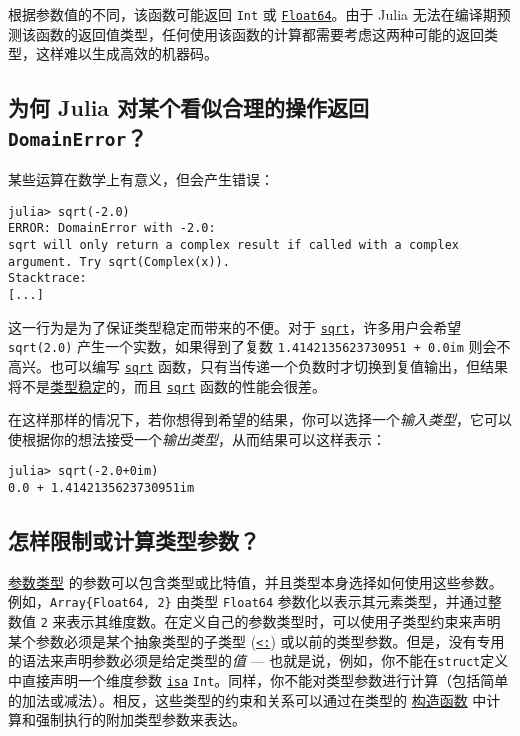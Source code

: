 根据参数值的不同，该函数可能返回 \texttt{Int} 或 \hyperlink{5027751419500983000}{\texttt{Float64}}。由于 Julia 无法在编译期预测该函数的返回值类型，任何使用该函数的计算都需要考虑这两种可能的返回类型，这样难以生成高效的机器码。



\hypertarget{6904365807459053438}{}


\subsection{为何 Julia 对某个看似合理的操作返回 \texttt{DomainError}？}



某些运算在数学上有意义，但会产生错误：




\begin{verbatim}
julia> sqrt(-2.0)
ERROR: DomainError with -2.0:
sqrt will only return a complex result if called with a complex argument. Try sqrt(Complex(x)).
Stacktrace:
[...]
\end{verbatim}



这一行为是为了保证类型稳定而带来的不便。对于 \hyperlink{4551113327515323898}{\texttt{sqrt}}，许多用户会希望 \texttt{sqrt(2.0)} 产生一个实数，如果得到了复数 \texttt{1.4142135623730951 + 0.0im} 则会不高兴。也可以编写 \hyperlink{4551113327515323898}{\texttt{sqrt}} 函数，只有当传递一个负数时才切换到复值输出，但结果将不是\hyperlink{5872221809740029239}{类型稳定}的，而且 \hyperlink{4551113327515323898}{\texttt{sqrt}} 函数的性能会很差。



在这样那样的情况下，若你想得到希望的结果，你可以选择一个\emph{输入类型}，它可以使根据你的想法接受一个\emph{输出类型}，从而结果可以这样表示：




\begin{verbatim}
julia> sqrt(-2.0+0im)
0.0 + 1.4142135623730951im
\end{verbatim}



\hypertarget{12834294993005118106}{}


\subsection{怎样限制或计算类型参数？}



\hyperlink{5611641345231583503}{参数类型} 的参数可以包含类型或比特值，并且类型本身选择如何使用这些参数。例如，\texttt{Array\{Float64, 2\}} 由类型 \texttt{Float64} 参数化以表示其元素类型，并通过整数值 \texttt{2} 来表示其维度数。在定义自己的参数类型时，可以使用子类型约束来声明某个参数必须是某个抽象类型的子类型 (\hyperlink{6254591906563366276}{\texttt{<:}}) 或以前的类型参数。但是，没有专用的语法来声明参数必须是给定类型的\emph{值} — 也就是说，例如，你不能在\texttt{struct}定义中直接声明一个维度参数 \hyperlink{7066325108767373297}{\texttt{isa}} \texttt{Int}。同样，你不能对类型参数进行计算（包括简单的加法或减法）。相反，这些类型的约束和关系可以通过在类型的 \hyperlink{1489967485005487723}{构造函数} 中计算和强制执行的附加类型参数来表达。



